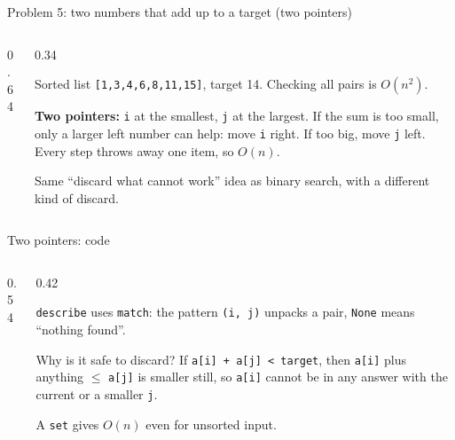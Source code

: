 \documentclass[aspectratio=169,10pt]{beamer}
\begin{document}
\begin{frame}{Problem 5: two numbers that add up to a target (two pointers)}
\begin{columns}[T]
\begin{column}{0.64\textwidth}
\begin{sfig}[0.7]
\begin{tikzpicture}
  
\end{tikzpicture}
\end{sfig}
\end{column}
\begin{column}{0.34\textwidth}
{\small
Sorted list \texttt{[1,3,4,6,8,11,15]}, target 14. Checking all pairs is $O(n^2)$.

\vspace{2mm}
\textbf{Two pointers:} \texttt{i} at the smallest, \texttt{j} at the largest. If the sum is too small, only a larger left number can help: move \texttt{i} right. If too big, move \texttt{j} left. Every step throws away one item, so $O(n)$.

\vspace{2mm}
Same ``discard what cannot work'' idea as binary search, with a different kind of discard.}
\end{column}
\end{columns}
\end{frame}

\begin{frame}{Two pointers: code}
\begin{columns}[T]
\begin{column}{0.54\textwidth}
\vspace{1mm}
\end{column}
\begin{column}{0.42\textwidth}
\vspace{2mm}
{\small
\texttt{describe} uses \texttt{match}: the pattern \texttt{(i, j)} unpacks a pair, \texttt{None} means ``nothing found''.

\vspace{2mm}
Why is it safe to discard? If \texttt{a[i] + a[j] < target}, then \texttt{a[i]} plus anything $\le$ \texttt{a[j]} is smaller still, so \texttt{a[i]} cannot be in any answer with the current or a smaller \texttt{j}.

\vspace{2mm}
A \texttt{set} gives $O(n)$ even for unsorted input.}
\end{column}
\end{columns}
\end{frame}
\end{document}
